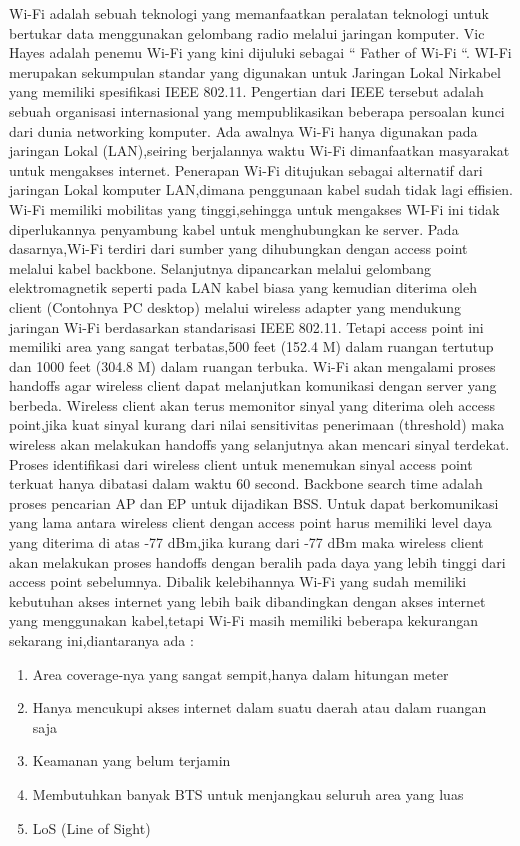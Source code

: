 Wi-Fi adalah sebuah teknologi yang memanfaatkan peralatan teknologi untuk bertukar data menggunakan gelombang radio melalui jaringan komputer. Vic Hayes adalah penemu Wi-Fi yang kini dijuluki sebagai “ Father of Wi-Fi “. WI-Fi merupakan sekumpulan standar yang digunakan untuk Jaringan Lokal Nirkabel yang memiliki spesifikasi IEEE 802.11. Pengertian dari IEEE tersebut adalah sebuah organisasi internasional yang mempublikasikan beberapa persoalan kunci dari dunia networking komputer. Ada awalnya Wi-Fi hanya digunakan pada jaringan Lokal (LAN),seiring berjalannya waktu Wi-Fi dimanfaatkan masyarakat untuk mengakses internet. Penerapan Wi-Fi  ditujukan sebagai alternatif dari jaringan Lokal komputer LAN,dimana penggunaan kabel sudah tidak lagi effisien. Wi-Fi memiliki mobilitas yang tinggi,sehingga untuk mengakses WI-Fi ini tidak diperlukannya penyambung kabel untuk menghubungkan ke server.
Pada dasarnya,Wi-Fi terdiri dari sumber yang dihubungkan dengan access point melalui kabel backbone. Selanjutnya dipancarkan melalui gelombang elektromagnetik seperti pada LAN kabel biasa yang kemudian diterima oleh client (Contohnya PC desktop) melalui wireless adapter yang mendukung jaringan Wi-Fi berdasarkan standarisasi IEEE 802.11. Tetapi access point ini memiliki area yang sangat terbatas,500 feet (152.4 M) dalam ruangan tertutup dan 1000 feet (304.8 M) dalam ruangan terbuka.
Wi-Fi akan mengalami proses handoffs agar wireless client dapat melanjutkan komunikasi dengan server yang berbeda. Wireless client akan terus memonitor sinyal yang diterima oleh access point,jika kuat sinyal kurang dari nilai sensitivitas penerimaan (threshold) maka wireless akan melakukan handoffs yang selanjutnya akan mencari sinyal terdekat. Proses identifikasi dari wireless client untuk menemukan sinyal access point terkuat hanya dibatasi dalam waktu 60 second. Backbone search time adalah proses pencarian AP dan EP untuk dijadikan BSS. Untuk dapat berkomunikasi yang lama antara wireless client dengan access point harus memiliki level daya yang diterima di atas -77 dBm,jika kurang dari -77 dBm maka wireless client akan melakukan proses handoffs dengan beralih pada daya yang lebih tinggi dari access point sebelumnya.
Dibalik kelebihannya Wi-Fi yang sudah memiliki kebutuhan  akses internet yang lebih baik dibandingkan dengan akses internet yang menggunakan kabel,tetapi Wi-Fi masih memiliki beberapa kekurangan sekarang ini,diantaranya ada :
\begin{enumerate}
\item Area coverage-nya yang sangat sempit,hanya dalam hitungan meter
\item Hanya mencukupi akses internet dalam suatu daerah atau dalam ruangan saja
\item Keamanan yang belum terjamin
\item Membutuhkan banyak BTS untuk menjangkau seluruh area yang luas
\item LoS (Line of Sight) 
\end{enumerate}

